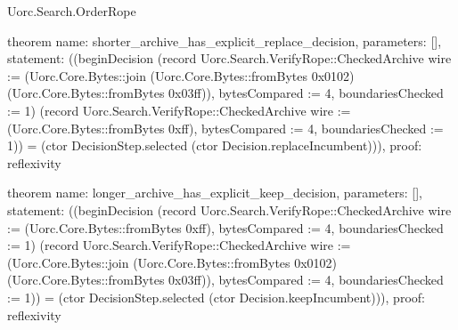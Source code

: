 \begin{lexlean}{Uorc.Search.OrderRope}
\begin{semanticmodule}
theorem{
  name: shorter_archive_has_explicit_replace_decision,
  parameters: [],
  statement: ((beginDecision (record Uorc.Search.VerifyRope::CheckedArchive {wire := (Uorc.Core.Bytes::join (Uorc.Core.Bytes::fromBytes 0x0102) (Uorc.Core.Bytes::fromBytes 0x03ff)), bytesCompared := 4, boundariesChecked := 1}) (record Uorc.Search.VerifyRope::CheckedArchive {wire := (Uorc.Core.Bytes::fromBytes 0xff), bytesCompared := 4, boundariesChecked := 1})) = (ctor DecisionStep.selected (ctor Decision.replaceIncumbent))),
  proof: reflexivity{}
}

theorem{
  name: longer_archive_has_explicit_keep_decision,
  parameters: [],
  statement: ((beginDecision (record Uorc.Search.VerifyRope::CheckedArchive {wire := (Uorc.Core.Bytes::fromBytes 0xff), bytesCompared := 4, boundariesChecked := 1}) (record Uorc.Search.VerifyRope::CheckedArchive {wire := (Uorc.Core.Bytes::join (Uorc.Core.Bytes::fromBytes 0x0102) (Uorc.Core.Bytes::fromBytes 0x03ff)), bytesCompared := 4, boundariesChecked := 1})) = (ctor DecisionStep.selected (ctor Decision.keepIncumbent))),
  proof: reflexivity{}
}
\end{semanticmodule}
\end{lexlean}
